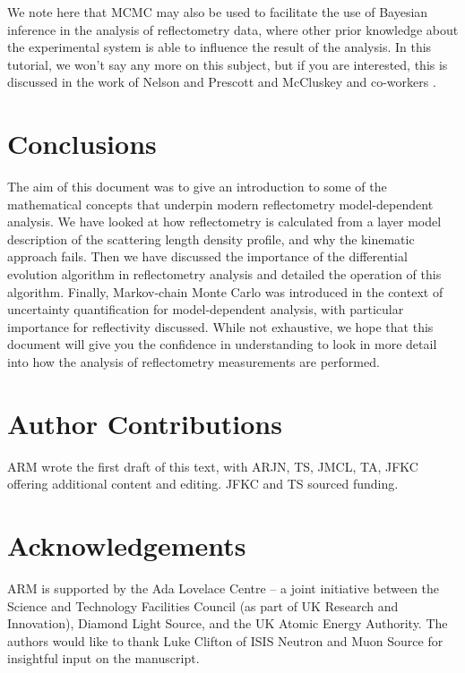 \documentclass[
 reprint,
 superscriptaddress,
 amsmath,amssymb,
 aps,
]{revtex4-1}
\begin{document}
We note here that MCMC may also be used to facilitate the use of Bayesian inference in the analysis of reflectometry data, where other prior knowledge about the experimental system is able to influence the result of the analysis.
In this tutorial, we won't say any more on this subject, but if you are interested, this is discussed in the work of Nelson and Prescott \cite{nelson_refnx_2019} and McCluskey and co-workers \cite{mccluskey_general_2020}.

\section{Conclusions}
The aim of this document was to give an introduction to some of the mathematical concepts that underpin modern reflectometry model-dependent analysis.
We have looked at how reflectometry is calculated from a layer model description of the scattering length density profile, and why the kinematic approach fails.
Then we have discussed the importance of the differential evolution algorithm in reflectometry analysis and detailed the operation of this algorithm.
Finally, Markov-chain Monte Carlo was introduced in the context of uncertainty quantification for model-dependent analysis, with particular importance for reflectivity discussed.
While not exhaustive, we hope that this document will give you the confidence in understanding to look in more detail into how the analysis of reflectometry measurements are performed.

\section*{Author Contributions}
ARM wrote the first draft of this text, with ARJN, TS, JMCL, TA, JFKC offering additional content and editing.
 JFKC and TS sourced funding.


\section*{Acknowledgements}
ARM is supported by the Ada Lovelace Centre -- a joint initiative between the Science and Technology Facilities Council (as part of UK Research and Innovation), Diamond Light Source, and the UK Atomic Energy Authority.
The authors would like to thank Luke Clifton of ISIS Neutron and Muon Source for insightful input on the manuscript.




\end{document}
